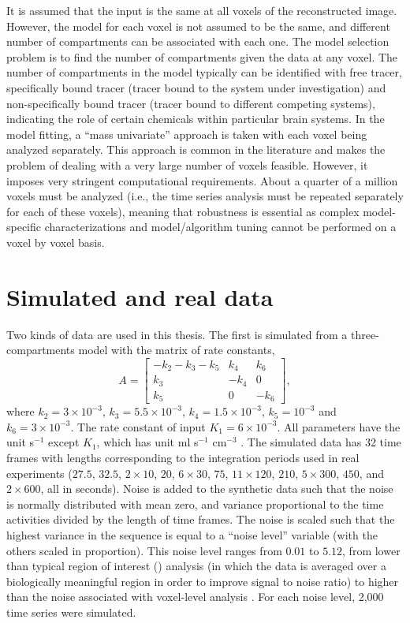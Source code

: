 It is assumed that the input is the same at all voxels of the reconstructed
image. However, the model for each voxel is not assumed to be the same, and
different number of compartments can be associated with each one. The model
selection problem is to find the number of compartments given the data at any
voxel. The number of compartments in the model typically can be identified
with free tracer, specifically bound tracer (tracer bound to the system under
investigation) and non-specifically bound tracer (tracer bound to different
competing systems), indicating the role of certain chemicals within particular
brain systems. In the model fitting, a ``mass univariate'' approach is taken
with each voxel being analyzed separately. This approach is common in the
literature and makes the problem of dealing with a very large number of voxels
feasible. However, it imposes very stringent computational requirements. About
a quarter of a million voxels must be analyzed (i.e., the time series analysis
must be repeated separately for each of these voxels), meaning that robustness
is essential as complex model-specific characterizations and model/algorithm
tuning cannot be performed on a voxel by voxel basis.

\section{Simulated and real \protect\pet data}
\label{sec:Simulated and real pet data}

Two kinds of data are used in this thesis. The first is simulated from a
three-compartments model with the matrix of rate constants,
\begin{equation}
  A = \begin{bmatrix}
    - k_2 - k_3 - k_5 & k_4  & k_6 \\
    k_3               & -k_4 & 0   \\
    k_5               & 0    & -k_6
  \end{bmatrix},
\end{equation}
where $k_2 = 3 \times 10^{-3}$, $k_3 = 5.5 \times 10^{-3}$, $k_4 = 1.5 \times
10^{-3}$, $k_5 = 10^{-3}$ and $k_6 = 3 \times 10^{-3}$. The rate constant of
input $K_1 = 6\times 10^{-3}$. All parameters have the unit s$^{-1}$ except
$K_1$, which has unit ml s$^{-1}$ cm$^{-3}$ \cite{RLNomen}. The simulated data
has 32 time frames with lengths corresponding to the integration periods used
in real experiments ($27.5$, $32.5$, $2 \times 10$, $20$, $6 \times 30$, $75$,
$11 \times 120$, $210$, $5 \times 300$, $450$, and $2 \times 600$, all in
seconds).  Noise is added to the synthetic data such that the noise is
normally distributed with mean zero, and variance proportional to the time
activities divided by the length of time frames. The noise is scaled such that
the highest variance in the sequence is equal to a ``noise level'' variable
(with the others scaled in proportion).  This noise level ranges from $0.01$
to $5.12$, from lower than typical region of interest (\roi) analysis (in
which the data is averaged over a biologically meaningful region in order to
improve signal to noise ratio) to higher than the noise associated with
voxel-level analysis \citep{Peng:2008fx}.  For each noise level, 2,000 time
series were simulated.

